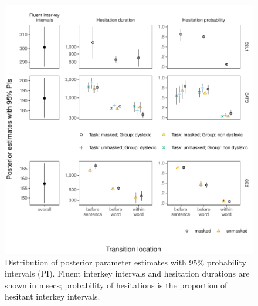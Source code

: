 \documentclass[
  man,floatsintext]{apa7}
\begin{document}
\begin{figure}[!htb]
\centering
\includegraphics{figures/psplots1constr.pdf}
\caption{Distribution of posterior parameter estimates with 95\% probability intervals (PI). Fluent interkey intervals and hesitation durations are shown in msecs; probability of hesitations is the proportion of hesitant interkey intervals.}
\end{figure}
\newpage
\end{document}
